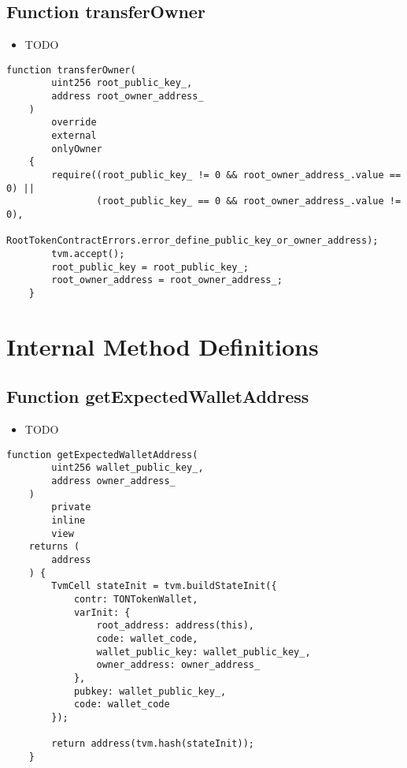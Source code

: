 \subsection{Function transferOwner}

\noindent\begin{itemize}
\item TODO
\end{itemize}

\begin{lstlisting}[firstnumber=441]
    function transferOwner(
        uint256 root_public_key_,
        address root_owner_address_
    )
        override
        external
        onlyOwner
    {
        require((root_public_key_ != 0 && root_owner_address_.value == 0) ||
                (root_public_key_ == 0 && root_owner_address_.value != 0),
                RootTokenContractErrors.error_define_public_key_or_owner_address);
        tvm.accept();
        root_public_key = root_public_key_;
        root_owner_address = root_owner_address_;
    }
\end{lstlisting}

\section{Internal Method Definitions}


\subsection{Function getExpectedWalletAddress}

\noindent\begin{itemize}
\item TODO
\end{itemize}

\begin{lstlisting}[firstnumber=486]
    function getExpectedWalletAddress(
        uint256 wallet_public_key_,
        address owner_address_
    )
        private
        inline
        view
    returns (
        address
    ) {
        TvmCell stateInit = tvm.buildStateInit({
            contr: TONTokenWallet,
            varInit: {
                root_address: address(this),
                code: wallet_code,
                wallet_public_key: wallet_public_key_,
                owner_address: owner_address_
            },
            pubkey: wallet_public_key_,
            code: wallet_code
        });

        return address(tvm.hash(stateInit));
    }
\end{lstlisting}

